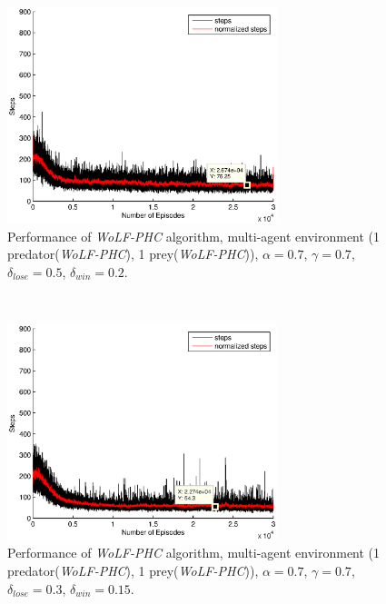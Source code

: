 \documentclass[a4paper,11pt]{article}
\begin{document}
\begin{figure}[ht!]
  \centering
    \includegraphics[width=0.7\textwidth]{figures/w07070502.eps}
    \caption{Performance of  \textit{WoLF-PHC} algorithm, multi-agent environment (1 predator(\textit{WoLF-PHC}), 1 prey(\textit{WoLF-PHC})), $\alpha = 0.7$, $\gamma = 0.7$, $\delta_{lose} = 0.5$, $\delta_{win} = 0.2$.}
    \label{w111}
\end{figure}
~
\begin{figure}[ht!]
  \centering
    \includegraphics[width=0.7\textwidth]{figures/w070703015.eps}
       \caption{Performance of  \textit{WoLF-PHC} algorithm, multi-agent environment (1 predator(\textit{WoLF-PHC}), 1 prey(\textit{WoLF-PHC})), $\alpha = 0.7$, $\gamma = 0.7$, $\delta_{lose} = 0.3$, $\delta_{win} = 0.15$.}
    \label{w112}
\end{figure}
~
\end{document}
